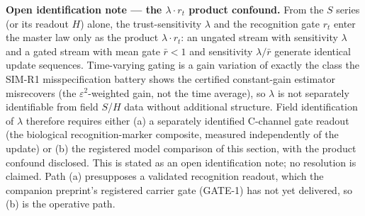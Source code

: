 \documentclass[
]{article}
\begin{document}
\textbf{Open identification note --- the \(\lambda \cdot r_t\) product
confound.} From the \(S\) series (or its readout \(H\)) alone, the
trust-sensitivity \(\lambda\) and the recognition gate \(r_t\) enter the
master law only as the product \(\lambda \cdot r_t\): an ungated stream
with sensitivity \(\lambda\) and a gated stream with mean gate
\(\bar{r} < 1\) and sensitivity \(\lambda/\bar{r}\) generate identical
update sequences. Time-varying gating is a gain variation of exactly the
class the SIM-R1 misspecification battery shows the certified
constant-gain estimator misrecovers (the \(\varepsilon^{2}\)-weighted
gain, not the time average), so \(\lambda\) is not separately
identifiable from field \(S\)/\(H\) data without additional structure.
Field identification of \(\lambda\) therefore requires either (a) a
separately identified C-channel gate readout (the biological
recognition-marker composite, measured independently of the update) or
(b) the registered model comparison of this section, with the product
confound disclosed. This is stated as an open identification note; no
resolution is claimed. Path (a) presupposes a validated recognition
readout, which the companion preprint's registered carrier gate (GATE-1)
has not yet delivered, so (b) is the operative path.
\end{document}
